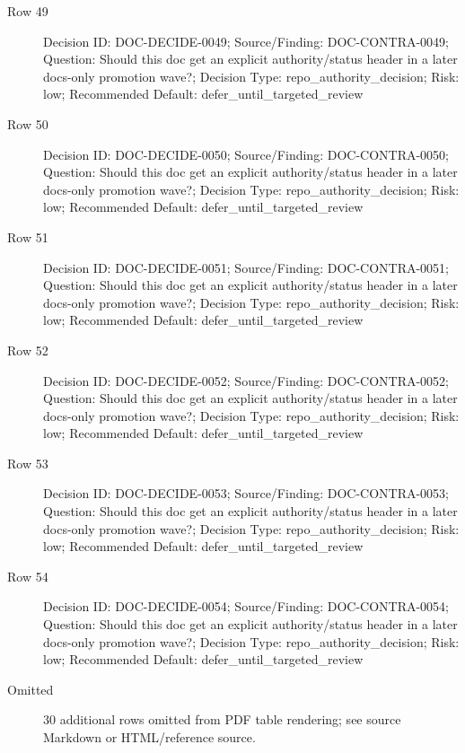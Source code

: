 \documentclass[10.5pt,a4paper,openany]{book}
\begin{document}
\begin{description}
\item[Row 49] Decision ID: DOC-\allowbreak{}DECIDE-\allowbreak{}0049; Source/\allowbreak{}Finding: DOC-\allowbreak{}CONTRA-\allowbreak{}0049; Question: Should this doc get an explicit authority/\allowbreak{}status header in a later docs-\allowbreak{}only promotion wave?; Decision Type: repo\_\allowbreak{}authority\_\allowbreak{}decision; Risk: low; Recommended Default: defer\_\allowbreak{}until\_\allowbreak{}targeted\_\allowbreak{}review
\item[Row 50] Decision ID: DOC-\allowbreak{}DECIDE-\allowbreak{}0050; Source/\allowbreak{}Finding: DOC-\allowbreak{}CONTRA-\allowbreak{}0050; Question: Should this doc get an explicit authority/\allowbreak{}status header in a later docs-\allowbreak{}only promotion wave?; Decision Type: repo\_\allowbreak{}authority\_\allowbreak{}decision; Risk: low; Recommended Default: defer\_\allowbreak{}until\_\allowbreak{}targeted\_\allowbreak{}review
\item[Row 51] Decision ID: DOC-\allowbreak{}DECIDE-\allowbreak{}0051; Source/\allowbreak{}Finding: DOC-\allowbreak{}CONTRA-\allowbreak{}0051; Question: Should this doc get an explicit authority/\allowbreak{}status header in a later docs-\allowbreak{}only promotion wave?; Decision Type: repo\_\allowbreak{}authority\_\allowbreak{}decision; Risk: low; Recommended Default: defer\_\allowbreak{}until\_\allowbreak{}targeted\_\allowbreak{}review
\item[Row 52] Decision ID: DOC-\allowbreak{}DECIDE-\allowbreak{}0052; Source/\allowbreak{}Finding: DOC-\allowbreak{}CONTRA-\allowbreak{}0052; Question: Should this doc get an explicit authority/\allowbreak{}status header in a later docs-\allowbreak{}only promotion wave?; Decision Type: repo\_\allowbreak{}authority\_\allowbreak{}decision; Risk: low; Recommended Default: defer\_\allowbreak{}until\_\allowbreak{}targeted\_\allowbreak{}review
\item[Row 53] Decision ID: DOC-\allowbreak{}DECIDE-\allowbreak{}0053; Source/\allowbreak{}Finding: DOC-\allowbreak{}CONTRA-\allowbreak{}0053; Question: Should this doc get an explicit authority/\allowbreak{}status header in a later docs-\allowbreak{}only promotion wave?; Decision Type: repo\_\allowbreak{}authority\_\allowbreak{}decision; Risk: low; Recommended Default: defer\_\allowbreak{}until\_\allowbreak{}targeted\_\allowbreak{}review
\item[Row 54] Decision ID: DOC-\allowbreak{}DECIDE-\allowbreak{}0054; Source/\allowbreak{}Finding: DOC-\allowbreak{}CONTRA-\allowbreak{}0054; Question: Should this doc get an explicit authority/\allowbreak{}status header in a later docs-\allowbreak{}only promotion wave?; Decision Type: repo\_\allowbreak{}authority\_\allowbreak{}decision; Risk: low; Recommended Default: defer\_\allowbreak{}until\_\allowbreak{}targeted\_\allowbreak{}review
\item[Omitted] 30 additional rows omitted from PDF table rendering; see source Markdown or HTML/\allowbreak{}reference source.\allowbreak{}
\end{description}
\end{document}
